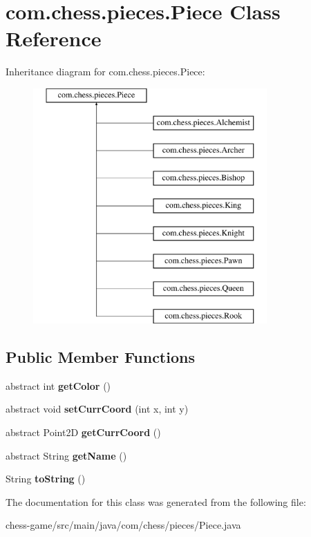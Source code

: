 \hypertarget{classcom_1_1chess_1_1pieces_1_1_piece}{}\section{com.\+chess.\+pieces.\+Piece Class Reference}
\label{classcom_1_1chess_1_1pieces_1_1_piece}
Inheritance diagram for com.\+chess.\+pieces.\+Piece\+:\begin{figure}[H]
\begin{center}
\leavevmode
\includegraphics[height=9.000000cm]{classcom_1_1chess_1_1pieces_1_1_piece}
\end{center}
\end{figure}
\subsection*{Public Member Functions}
\begin{DoxyCompactItemize}
\item 
\mbox{\label{classcom_1_1chess_1_1pieces_1_1_piece_afe027a50459cb434c1250b91517b6e8b}} 
abstract int {\bfseries get\+Color} ()
\item 
\mbox{\label{classcom_1_1chess_1_1pieces_1_1_piece_ac9d454a362b6ca908ae3296cc7a94678}} 
abstract void {\bfseries set\+Curr\+Coord} (int x, int y)
\item 
\mbox{\label{classcom_1_1chess_1_1pieces_1_1_piece_a590e875e66ec0b51128d09a06c824246}} 
abstract Point2D {\bfseries get\+Curr\+Coord} ()
\item 
\mbox{\label{classcom_1_1chess_1_1pieces_1_1_piece_a5b2da06904e4719e211007858a2994c5}} 
abstract String {\bfseries get\+Name} ()
\item 
\mbox{\label{classcom_1_1chess_1_1pieces_1_1_piece_a6805f3c6004698eba25a69e1d9d2b975}} 
String {\bfseries to\+String} ()
\end{DoxyCompactItemize}


The documentation for this class was generated from the following file\+:\begin{DoxyCompactItemize}
\item 
chess-\/game/src/main/java/com/chess/pieces/Piece.\+java\end{DoxyCompactItemize}
